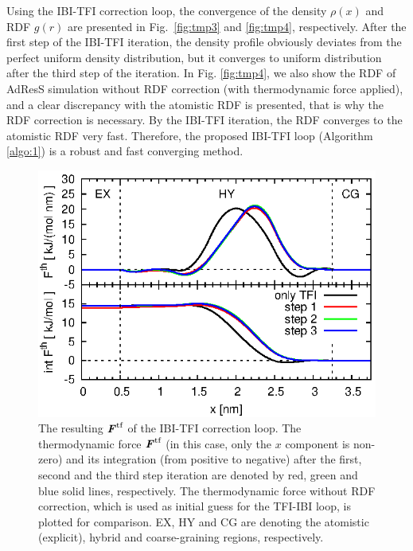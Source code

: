\documentclass[aps,pre,preprint,unsortedaddress]{revtex4}
\renewcommand{\v}[1]{\textbf{\textit{#1}}}
\begin{document}
Using the IBI-TFI correction loop,
the convergence of the density $\rho(x)$ and RDF $g(r)$ are presented
in Fig.~\ref{fig:tmp3} and \ref{fig:tmp4}, respectively. After the
first step of the IBI-TFI iteration, the density profile obviously
deviates from the perfect uniform density distribution, but it
converges to uniform distribution after the third step of the
iteration. In Fig. \ref{fig:tmp4}, we also show the RDF of AdResS
simulation without RDF correction (with thermodynamic force applied),
and a clear discrepancy with the atomistic RDF is presented,
that is why the RDF correction is necessary.  By
the IBI-TFI iteration, the RDF converges to the atomistic RDF very
fast. Therefore, the proposed IBI-TFI loop (Algorithm \ref{algo:1}) is
a robust and fast converging method.

\begin{figure}
  \centering
  \includegraphics{fig.2/tf-and-int.eps}
  \caption{The resulting $\v F^{\textrm{tf}}$ of the IBI-TFI
    correction loop.  The thermodynamic force $\v F^{\textrm{tf}}$ (in
    this case, only the $x$ component is non-zero) and its integration
    (from positive to negative) after the first, second and the third
    step iteration are denoted by red, green and blue solid lines,
    respectively.  The thermodynamic force without RDF correction,
    which is used as initial guess for the TFI-IBI loop, is plotted
    for comparison. EX, HY and CG are denoting the atomistic
    (explicit), hybrid and coarse-graining regions, respectively.}
  \label{fig:tmp5}
\end{figure}
\end{document}
